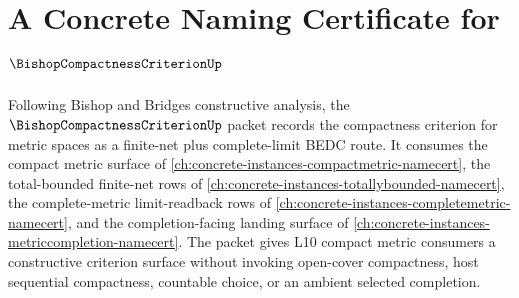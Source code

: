 \chapter{A Concrete Naming Certificate for $\BishopCompactnessCriterionUp$}
\label{ch:concrete-instances-bishop-compactness-criterion-namecert}

Following Bishop and Bridges constructive analysis, the $\BishopCompactnessCriterionUp$ packet records the compactness criterion for metric spaces as a finite-net plus complete-limit BEDC route. It consumes the compact metric surface of \autoref{ch:concrete-instances-compactmetric-namecert}, the total-bounded finite-net rows of \autoref{ch:concrete-instances-totallybounded-namecert}, the complete-metric limit-readback rows of \autoref{ch:concrete-instances-completemetric-namecert}, and the completion-facing landing surface of \autoref{ch:concrete-instances-metriccompletion-namecert}. The packet gives L10 compact metric consumers a constructive criterion surface without invoking open-cover compactness, host sequential compactness, countable choice, or an ambient selected completion.

